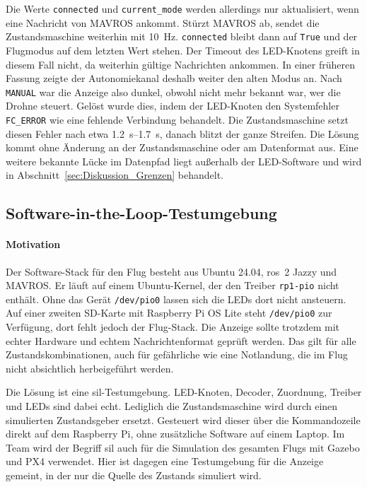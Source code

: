             Die Werte \texttt{connected} und \texttt{current\_mode} werden allerdings nur aktualisiert, wenn eine Nachricht von MAVROS ankommt. Stürzt MAVROS ab, sendet die Zustandsmaschine weiterhin mit \SI{10}{\hertz}. \texttt{connected} bleibt dann auf \texttt{True} und der Flugmodus auf dem letzten Wert stehen. Der Timeout des LED-Knotens greift in diesem Fall nicht, da weiterhin gültige Nachrichten ankommen. In einer früheren Fassung zeigte der Autonomiekanal deshalb weiter den alten Modus an. Nach \texttt{MANUAL} war die Anzeige also dunkel, obwohl nicht mehr bekannt war, wer die Drohne steuert. Gelöst wurde dies, indem der LED-Knoten den Systemfehler \texttt{FC\_ERROR} wie eine fehlende Verbindung behandelt. Die Zustandsmaschine setzt diesen Fehler nach etwa \SIrange{1,2}{1,7}{\second}, danach blitzt der ganze Streifen. Die Lösung kommt ohne Änderung an der Zustandsmaschine oder am Datenformat aus. Eine weitere bekannte Lücke im Datenpfad liegt außerhalb der LED-Software und wird in Abschnitt~\ref{sec:Diskussion_Grenzen} behandelt.

        \subsection{Software-in-the-Loop-Testumgebung}
        \label{sec:LED_SIL}

            \paragraph{Motivation}
            Der Software-Stack für den Flug besteht aus Ubuntu 24.04, \gls{ros}~2 Jazzy und MAVROS. Er läuft auf einem Ubuntu-Kernel, der den Treiber \texttt{rp1-pio} nicht enthält. Ohne das Gerät \texttt{/dev/pio0} lassen sich die LEDs dort nicht ansteuern. Auf einer zweiten SD-Karte mit Raspberry Pi OS Lite steht \texttt{/dev/pio0} zur Verfügung, dort fehlt jedoch der Flug-Stack. Die Anzeige sollte trotzdem mit echter Hardware und echtem Nachrichtenformat geprüft werden. Das gilt für alle Zustandskombinationen, auch für gefährliche wie eine Notlandung, die im Flug nicht absichtlich herbeigeführt werden.

            Die Lösung ist eine \gls{sil}-Testumgebung. LED-Knoten, Decoder, Zuordnung, Treiber und LEDs sind dabei echt. Lediglich die Zustandsmaschine wird durch einen simulierten Zustandsgeber ersetzt. Gesteuert wird dieser über die Kommandozeile direkt auf dem Raspberry Pi, ohne zusätzliche Software auf einem Laptop. Im Team wird der Begriff \gls{sil} auch für die Simulation des gesamten Flugs mit Gazebo und PX4 verwendet. Hier ist dagegen eine Testumgebung für die Anzeige gemeint, in der nur die Quelle des Zustands simuliert wird.

